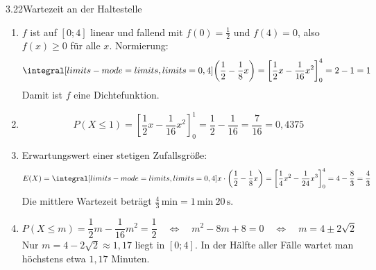\begin{loesung}{3.22}{Wartezeit an der Haltestelle}
\begin{enumerate}[label=\alph*)]
  \item $f$ ist auf $[0;4]$ linear und fallend mit $f(0) = \frac{1}{2}$ und $f(4) = 0$, also $f(x)\geq 0$ für alle $x$. Normierung:
  \[\integral[limits-mode=limits,limits={0, 4}]{\left(\dfrac{1}{2}-\dfrac{1}{8}x\right)} = \left[\dfrac{1}{2}x-\dfrac{1}{16}x^2\right]_0^4 = 2-1 = 1\]
  Damit ist $f$ eine Dichtefunktion.
  \item \[P(X\leq 1) = \left[\dfrac{1}{2}x-\dfrac{1}{16}x^2\right]_0^1 = \dfrac{1}{2}-\dfrac{1}{16} = \dfrac{7}{16} = 0{,}4375\]
  \item Erwartungswert einer stetigen Zufallsgröße:
  \[E(X) = \integral[limits-mode=limits,limits={0, 4}]{x\cdot\left(\dfrac{1}{2}-\dfrac{1}{8}x\right)} = \left[\dfrac{1}{4}x^2-\dfrac{1}{24}x^3\right]_0^4 = 4-\dfrac{8}{3} = \dfrac{4}{3}\]
  Die mittlere Wartezeit beträgt $\frac{4}{3}\,\text{min} = 1\,\text{min}\ 20\,\text{s}$.
  \item \[P(X\leq m) = \dfrac{1}{2}m-\dfrac{1}{16}m^2 = \dfrac{1}{2}\quad\Longleftrightarrow\quad m^2-8m+8 = 0\quad\Longleftrightarrow\quad m = 4\pm 2\sqrt{2}\]
  Nur $m = 4-2\sqrt{2}\approx 1{,}17$ liegt in $[0;4]$. In der Hälfte aller Fälle wartet man höchstens etwa $1{,}17$ Minuten.
\end{enumerate}
\end{loesung}

\LoesungskapitelEnde
